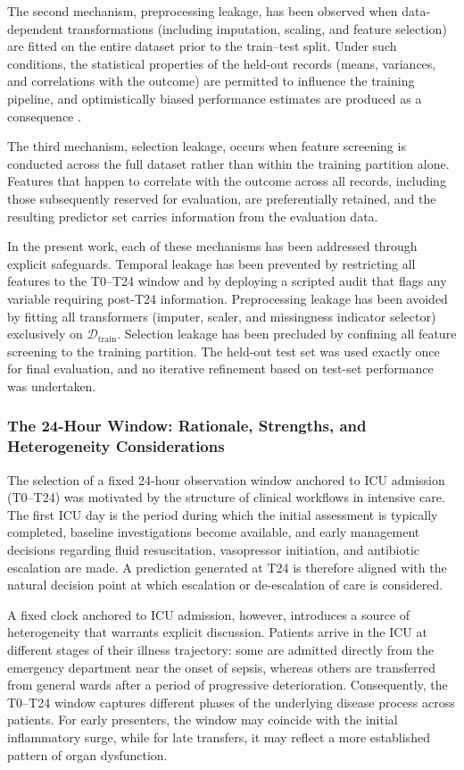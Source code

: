 The second mechanism, preprocessing leakage, has been observed when data-dependent transformations (including imputation, scaling, and feature selection) are fitted on the entire dataset prior to the train--test split. Under such conditions, the statistical properties of the held-out records (means, variances, and correlations with the outcome) are permitted to influence the training pipeline, and optimistically biased performance estimates are produced as a consequence \citep{Kang_Yoon_2023}.

The third mechanism, selection leakage, occurs when feature screening is conducted across the full dataset rather than within the training partition alone. Features that happen to correlate with the outcome across all records, including those subsequently reserved for evaluation, are preferentially retained, and the resulting predictor set carries information from the evaluation data.

In the present work, each of these mechanisms has been addressed through explicit safeguards. Temporal leakage has been prevented by restricting all features to the T0--T24 window and by deploying a scripted audit that flags any variable requiring post-T24 information. Preprocessing leakage has been avoided by fitting all transformers (imputer, scaler, and missingness indicator selector) exclusively on $\mathcal{D}_{\text{train}}$. Selection leakage has been precluded by confining all feature screening to the training partition. The held-out test set was used exactly once for final evaluation, and no iterative refinement based on test-set performance was undertaken.

\subsubsection{The 24-Hour Window: Rationale, Strengths, and Heterogeneity Considerations}\label{sec:t24-heterogeneity}
The selection of a fixed 24-hour observation window anchored to ICU admission (T0--T24) was motivated by the structure of clinical workflows in intensive care. The first ICU day is the period during which the initial assessment is typically completed, baseline investigations become available, and early management decisions regarding fluid resuscitation, vasopressor initiation, and antibiotic escalation are made. A prediction generated at T24 is therefore aligned with the natural decision point at which escalation or de-escalation of care is considered.

A fixed clock anchored to ICU admission, however, introduces a source of heterogeneity that warrants explicit discussion. Patients arrive in the ICU at different stages of their illness trajectory: some are admitted directly from the emergency department near the onset of sepsis, whereas others are transferred from general wards after a period of progressive deterioration. Consequently, the T0--T24 window captures different phases of the underlying disease process across patients. For early presenters, the window may coincide with the initial inflammatory surge, while for late transfers, it may reflect a more established pattern of organ dysfunction.


